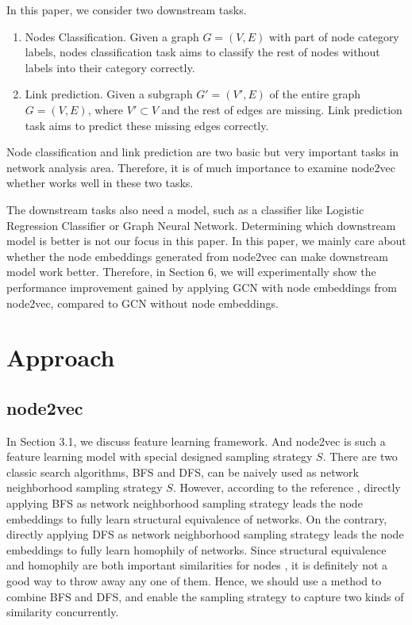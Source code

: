 \documentclass[sigconf]{acmart}
\begin{document}
In this paper, we consider two downstream tasks.\par
\begin{enumerate}
    \item Nodes Classification. Given a graph $G=(V, E)$ with part of node category labels, nodes classification task aims to classify the rest of nodes without labels into their category correctly.
    \item Link prediction. Given a subgraph $G'=(V',E)$ of the entire graph $G=(V,E)$, where $V'\subset V$ and the rest of edges are missing. Link prediction task aims to predict these missing edges correctly.
\end{enumerate}
Node classification and link prediction are two basic but very important tasks in network analysis area. Therefore, it is of much importance to examine node2vec whether works well in these two tasks.

The downstream tasks also need a model, such as a classifier like Logistic Regression Classifier or Graph Neural Network. Determining which downstream model is better is not our focus in this paper. In this paper, we mainly care about whether the node embeddings generated from node2vec can make downstream model work better. Therefore, in Section 6, we will experimentally show the performance improvement gained by applying GCN with node embeddings from node2vec, compared to GCN without node embeddings.


\section{Approach}

\subsection{node2vec}

In Section 3.1, we discuss feature learning framework. And node2vec is such a feature learning model with special designed sampling strategy $S$. There are two classic search algorithms, BFS and DFS, can be naively used as network neighborhood sampling strategy $S$. However, according to the reference \cite{node2vec}, directly applying BFS as network neighborhood sampling strategy leads the node embeddings to fully learn structural equivalence of networks. On the contrary, directly applying DFS as network neighborhood sampling strategy leads the node embeddings to fully learn homophily of networks. Since structural equivalence and homophily are both important similarities for nodes \cite{mikolov2013distributed}, it is definitely not a good way to throw away any one of them. Hence, we should use a method to combine BFS and DFS, and enable the sampling strategy to capture two kinds of similarity concurrently.
\end{document}
